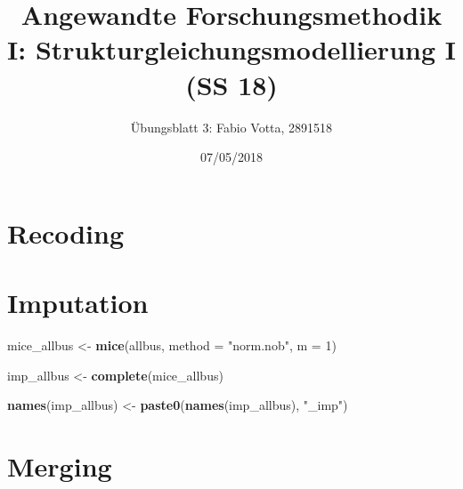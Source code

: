 \documentclass[]{article}
\title{Angewandte Forschungsmethodik I: Strukturgleichungsmodellierung I (SS
18)}
\author{Übungsblatt 3: Fabio Votta, 2891518}
\date{07/05/2018}
\newenvironment{Shaded}{\begin{snugshade}}{\end{snugshade}}
\newcommand{\KeywordTok}[1]{\textcolor[rgb]{0.13,0.29,0.53}{\textbf{#1}}}
\newcommand{\DataTypeTok}[1]{\textcolor[rgb]{0.13,0.29,0.53}{#1}}
\newcommand{\DecValTok}[1]{\textcolor[rgb]{0.00,0.00,0.81}{#1}}
\newcommand{\StringTok}[1]{\textcolor[rgb]{0.31,0.60,0.02}{#1}}
\newcommand{\CommentTok}[1]{\textcolor[rgb]{0.56,0.35,0.01}{\textit{#1}}}
\newcommand{\OperatorTok}[1]{\textcolor[rgb]{0.81,0.36,0.00}{\textbf{#1}}}
\newcommand{\NormalTok}[1]{#1}
\begin{document}
\maketitle

\section{Recoding}\label{recoding}

\begin{Shaded}
\end{Shaded}

\section{Imputation}\label{imputation}

\begin{Shaded}
\begin{Highlighting}[]
\NormalTok{mice_allbus <-}\StringTok{ }\KeywordTok{mice}\NormalTok{(allbus, }\DataTypeTok{method =} \StringTok{"norm.nob"}\NormalTok{, }\DataTypeTok{m =} \DecValTok{1}\NormalTok{)}

\NormalTok{imp_allbus <-}\StringTok{ }\KeywordTok{complete}\NormalTok{(mice_allbus)}

\KeywordTok{names}\NormalTok{(imp_allbus) <-}\StringTok{ }\KeywordTok{paste0}\NormalTok{(}\KeywordTok{names}\NormalTok{(imp_allbus), }\StringTok{"_imp"}\NormalTok{)}
\end{Highlighting}
\end{Shaded}

\section{Merging}\label{merging}
\end{document}

